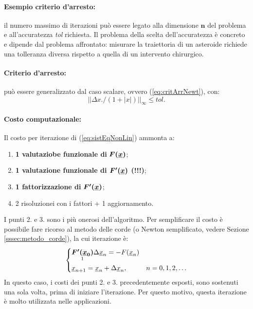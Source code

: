 \paragraph{Esempio criterio d'arresto:}{il numero massimo di iterazioni può essere legato alla dimensione $\boldsymbol n$ del problema e all'accuratezza \textit{tol} richiesta.} Il problema della scelta dell'accuratezza è concreto e dipende dal problema affrontato: misurare la traiettoria di un asteroide richiede una tolleranza diversa rispetto a quella di un intervento chirurgico. 

\paragraph{Criterio d'arresto:} può essere generalizzato dal caso scalare, ovvero (\ref{eq:critArrNewt}), con:
\begin{equation}
    ||\Delta x.\slash(1+|x|)||_\infty\leq tol.
\end{equation}

\paragraph{Costo computazionale:} Il costo per iterazione di (\ref{eq:sistEqNonLin}) ammonta a:
\begin{enumerate}
    \item \textbf{1 valutaziobe funzionale di} $\boldsymbol{F(\uline x)}$;
    \item \textbf{1 valutazione funzionale di $\boldsymbol{F'(\uline x)}$ (!!!)};
    \item \textbf{1 fattorizzazione di} $\boldsymbol{F'(\uline x)}$;
    \item 2 risoluzionei con i fattori + 1 aggiornamento.
\end{enumerate}
I punti 2. e 3. sono i più onerosi dell'algoritmo. Per semplificare il costo è possibile fare ricorso al metodo delle corde (o Newton semplificato, vedere Sezione \ref{sssec:metodo_corde}), la cui iterazione è:
\begin{equation*}
    \begin{cases}
        \underset{\footnotemark}{\boldsymbol{F'(\uline x_0)}}\Delta\uline x_n = - F(\uline x_n)\\
        \uline x_{n+1} = \uline x_n + \Delta\uline x_n, & n=0,1,2,\hdots
    \end{cases}
\end{equation*}
In questo caso, i costi dei punti 2. e 3. precedentemente esposti, sono sostenuti una sola volta, prima di iniziare l'iterazione. Per questo motivo, questa iterazione è molto utilizzata nelle applicazioni.

